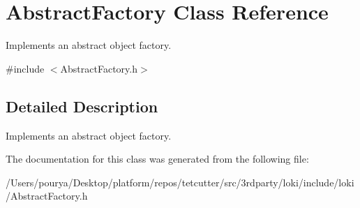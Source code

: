 \hypertarget{classAbstractFactory}{}\section{Abstract\+Factory Class Reference}
\label{classAbstractFactory}


Implements an abstract object factory.  




{\ttfamily \#include $<$Abstract\+Factory.\+h$>$}



\subsection{Detailed Description}
Implements an abstract object factory. 

The documentation for this class was generated from the following file\+:\begin{DoxyCompactItemize}
\item 
/\+Users/pourya/\+Desktop/platform/repos/tetcutter/src/3rdparty/loki/include/loki/Abstract\+Factory.\+h\end{DoxyCompactItemize}
